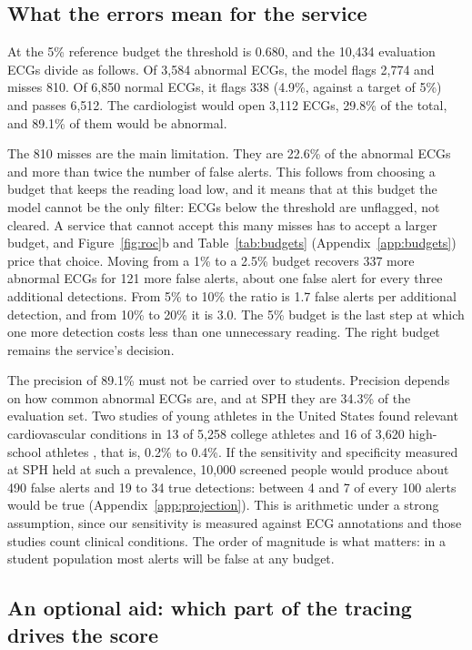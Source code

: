 \documentclass[letterpaper,11pt]{article}
\begin{document}
\subsection{What the errors mean for the service}

At the 5\% reference budget the threshold is 0.680, and the 10,434 evaluation ECGs divide as follows. Of 3,584 abnormal ECGs, the model flags 2,774 and misses 810. Of 6,850 normal ECGs, it flags 338 (4.9\%, against a target of 5\%) and passes 6,512. The cardiologist would open 3,112 ECGs, 29.8\% of the total, and 89.1\% of them would be abnormal.

The 810 misses are the main limitation. They are 22.6\% of the abnormal ECGs and more than twice the number of false alerts. This follows from choosing a budget that keeps the reading load low, and it means that at this budget the model cannot be the only filter: ECGs below the threshold are unflagged, not cleared. A service that cannot accept this many misses has to accept a larger budget, and Figure~\ref{fig:roc}b and Table~\ref{tab:budgets} (Appendix~\ref{app:budgets}) price that choice. Moving from a 1\% to a 2.5\% budget recovers 337 more abnormal ECGs for 121 more false alerts, about one false alert for every three additional detections. From 5\% to 10\% the ratio is 1.7 false alerts per additional detection, and from 10\% to 20\% it is 3.0. The 5\% budget is the last step at which one more detection costs less than one unnecessary reading. The right budget remains the service's decision.

The precision of 89.1\% must not be carried over to students. Precision depends on how common abnormal ECGs are, and at SPH they are 34.3\% of the evaluation set. Two studies of young athletes in the United States found relevant cardiovascular conditions in 13 of 5,258 college athletes \parencite{drezner2016electrocardiographic} and 16 of 3,620 high-school athletes \parencite{williams2019performance}, that is, 0.2\% to 0.4\%. If the sensitivity and specificity measured at SPH held at such a prevalence, 10,000 screened people would produce about 490 false alerts and 19 to 34 true detections: between 4 and 7 of every 100 alerts would be true (Appendix~\ref{app:projection}). This is arithmetic under a strong assumption, since our sensitivity is measured against ECG annotations and those studies count clinical conditions. The order of magnitude is what matters: in a student population most alerts will be false at any budget.

\subsection{An optional aid: which part of the tracing drives the score}
\label{sec:where}
\end{document}
